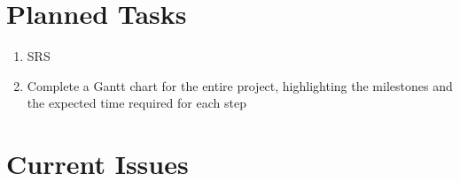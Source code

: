 \documentclass[paper=usletter, fontsize=12pt]{article}
\begin{document}
    \section{Planned Tasks}
    \begin{enumerate}[label=\alph*)]

        \item SRS

        \item Complete a Gantt chart for the entire project, highlighting the milestones and the expected time required for each step

    \end{enumerate}


    \section{Current Issues}

   
\end{document}
